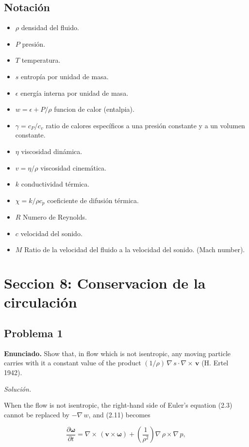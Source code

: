 \documentclass{article}
\begin{document}
\subsection*{Notación}
\begin{itemize}
    \item $\rho $ densidad del fluido.
    \item $P$ presión.
    \item $T$ temperatura.
    \item $s$ entropía por unidad de masa.
    \item $\epsilon$ energía interna por unidad de masa.
    \item $w = \epsilon + P/\rho$ funcion de calor (entalpia).
    \item $\gamma = c_{P}/c_{v}$ ratio de calores específicos a una presión constante y a un volumen constante.
    \item $\eta$ viscosidad dinámica.
    \item $v= \eta / \rho$ viscosidad cinemática.
    \item $k$ conductividad térmica.
    \item $\chi =k/\rho c_{p}$ coeficiente de difusión térmica.
    \item $R$ Numero de Reynolds.
    \item $c$ velocidad del sonido.
    \item $M$ Ratio de la velocidad del fluido a la velocidad del sonido. (Mach number).
\end{itemize}
\section*{Seccion 8: Conservacion de la circulación}
\subsection*{Problema 1}

\textbf{Enunciado.} Show that, in flow which is not isentropic, any moving particle carries with it a constant value of the product $(1/\rho) \, \nabla \, s \cdot \nabla \times \, \mathbf{v}$ (H. Ertel 1942).

\textit{Solución.}

When the flow is not isentropic, the right-hand side of Euler's equation (2.3) cannot be replaced by $-\nabla \, w$, and (2.11) becomes

$$
\frac{\partial \boldsymbol{\omega}}{\partial t} = \nabla \times \, (\mathbf{v} \times \boldsymbol{\omega}) + \left( \frac{1}{\rho^2} \right) \nabla \, \rho \times \nabla \, p,
$$
\end{document}
